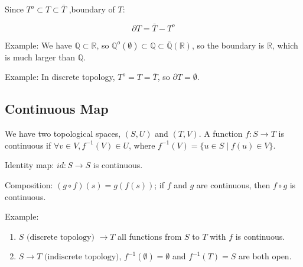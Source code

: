 \documentclass{article}
\begin{document}
        Since $T^{o} \subset T \subset \bar{T}$ ,boundary of $T$:
        
        \begin{displaymath}
        \partial T = \bar{T} - T^{o}
        \end{displaymath}
        
        Example: We have $\mathbb{Q} \subset \mathbb{R}$, so $\mathbb{Q}^{o} (\emptyset) \subset \mathbb{Q} \subset \bar{\mathbb{Q}} (\mathbb{R})$, so the boundary is $\mathbb{R}$, which is much larger than $\mathbb{Q}$.
        
        Example: In discrete topology, $T^{o} = T = \bar{T}$, so $\partial T = \emptyset$.
        
        \subsection{Continuous Map}
        
        We have two topological spaces, $(S, U)$ and $(T, V)$. A function $f : S \rightarrow T$ is continuous if $\forall v \in V, f^{-1} (V) \in U$, where $f^{-1}(V) = \{ u \in S \mid f(u) \in V \}$.
        
        Identity map: $id : S \rightarrow S$ is continuous.
        
        Composition: $(g \circ f) (s) = g(f(s))$; if $f$ and $g$ are continuous, then $f \circ g$ is continuous.
        
        Example:
        
        \begin{enumerate}
            \item $S \text{ (discrete topology) } \rightarrow T$ all functions from $S$ to $T$ with $f$ is continuous.
            \item $S \rightarrow T \text{ (indiscrete topology)}$, $f^{-1}(\emptyset) = \emptyset$ and $f^{-1}(T) = S$ are both open.
        \end{enumerate}
\end{document}
